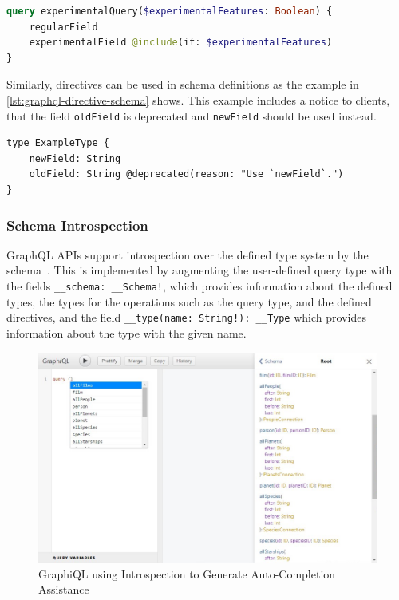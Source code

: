 \begin{lstlisting}[caption={Usage of a Directive in a GraphQL Query}, language=graphql, label={lst:graphql-directive-query}]
query experimentalQuery($experimentalFeatures: Boolean) {
    regularField
    experimentalField @include(if: $experimentalFeatures)
}
\end{lstlisting}

Similarly, directives can be used in schema definitions as the example in \autoref{lst:graphql-directive-schema} shows.
This example includes a notice to clients, that the field \texttt{oldField} is deprecated and \texttt{newField} should be used instead.

\begin{lstlisting}[caption={Usage of a Directive in a GraphQL Schema~\cite{Facebook2018}}, language=graphqls, label={lst:graphql-directive-schema}]
type ExampleType {
    newField: String
    oldField: String @deprecated(reason: "Use `newField`.")
}
\end{lstlisting}

\subsubsection{Schema Introspection}

GraphQL \acp{API} support introspection over the defined type system by the schema~\cite{Facebook2018}.
This is implemented by augmenting the user-defined query type with the fields \texttt{\_\_schema: \_\_Schema!}, which provides information about the defined types, the types for the operations such as the query type, and the defined directives, and the field \texttt{\_\_type(name: String!): \_\_Type} which provides information about the type with the given name.%

\begin{figure}[htb!]
    \includegraphics[width=\textwidth]{images/graphiql-autocomplete.png}
    \caption{GraphiQL using Introspection to Generate Auto-Completion Assistance}\label{img:graphiql-introspection}
\end{figure}

